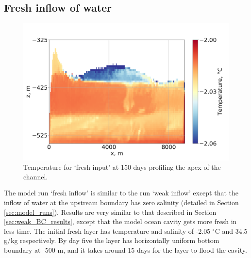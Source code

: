 \subsection{Fresh inflow of water} \label{sec:fresh_inflow}

\begin{figure}[!ht]
\centering
\includegraphics[width=1\textwidth]{chapters/4/fresh_input_T.png}
\caption[]{Temperature for `fresh input' at 150 days profiling the apex of the channel.}
\label{fig:fresh_input_T}
\end{figure}

The model run `fresh inflow' is similar to the run `weak inflow' except that the inflow of water at the upstream boundary has zero salinity (detailed in Section \ref{sec:model_runs}). Results are very similar to that described in Section \ref{sec:weak_BC_results}, except that the model ocean cavity gets more fresh in less time.
The initial fresh layer has temperature and salinity of -2.05 $^{\circ}$C and 34.5  g/kg respectively.  By day five the layer has horizontally uniform bottom boundary at -500 m, and it takes around 15 days for the layer to flood the cavity.

